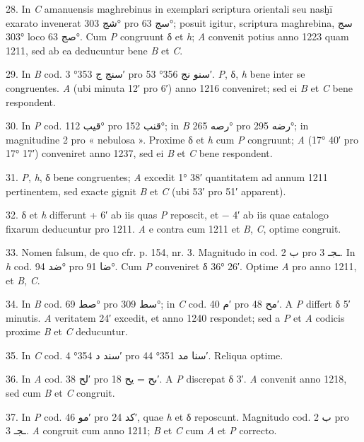 \documentclass[11pt]{article}
\begin{document}
{\small
\par\hangindent=12mm 28. In \textit{C} amanuensis maghrebinus in exemplari scriptura orientali seu nasḫī exarato invenerat \textarabic{شج} 303° pro \textarabic{سج} 63°; posuit igitur, scriptura maghrebina, \textarabic{سج} 303° loco \textarabic{صج} 63°. Cum \textit{P} congruunt δ et \textit{h}; \textit{A} convenit potius anno 1223 quam 1211, sed ab ea deducuntur bene \textit{B} et \textit{C}.
\par\hangindent=12mm 29. In \textit{B} cod. \textarabic{سنج ج} 353° 3′ pro \textarabic{سنو نج} 356° 53′. \textit{P}, δ, \textit{h} bene inter se congruentes. \textit{A} (ubi minuta 12′ pro 6′) anno 1216 conveniret; sed ei \textit{B} et \textit{C} bene respondent.
\par\hangindent=12mm 30. In \textit{P} cod. \textarabic{قيب} 112° pro \textarabic{قنب} 152°; in \textit{B} \textarabic{رصه} 265° pro \textarabic{رضه} 295°; in magnitudine 2 pro « nebulosa ». Proxime δ et \textit{h} cum \textit{P} congruunt; \textit{A} (17° 40′ pro 17° 17′) conveniret anno 1237, sed ei \textit{B} et \textit{C} bene respondent.
\par\hangindent=12mm 31. \textit{P}, \textit{h}, δ bene congruentes; \textit{A} excedit 1° 38′ quantitatem ad annum 1211 pertinentem, sed exacte gignit \textit{B} et \textit{C} (ubi 53′ pro 51′ apparent).
\par\hangindent=12mm 32. δ et \textit{h} differunt + 6′ ab iis quas \textit{P} reposcit, et − 4′ ab iis quae catalogo fixarum deducuntur pro 1211. \textit{A} e contra cum 1211 et \textit{B}, \textit{C}, optime congruit.
\par\hangindent=12mm 33. Nomen falsum, de quo cfr. p. 154, nr. 3. Magnitudo in cod. \textarabic{ب} 2 pro \textarabic{ـجـ} 3. In \textit{h} cod. \textarabic{ضد} 94° pro \textarabic{ضا} 91°. Cum \textit{P} conveniret δ 36° 26′. Optime \textit{A} pro anno 1211, et \textit{B}, \textit{C}.
\par\hangindent=12mm 34. In \textit{B} cod. \textarabic{صط} 69° pro \textarabic{سط} 309°; in \textit{C} cod. \textarabic{م} 40′ pro \textarabic{مح} 48′. A \textit{P} differt δ 5′ minutis. \textit{A} veritatem 24′ excedit, et anno 1240 respondet; sed a \textit{P} et \textit{A} codicis proxime \textit{B} et \textit{C} deducuntur.
\par\hangindent=12mm 35. In \textit{C} cod. \textarabic{سند د} 354° 4′ pro \textarabic{سنا مد} 351° 44′. Reliqua optime.
\par\hangindent=12mm 36. In \textit{A} cod. \textarabic{لح} 38′ pro \textarabic{ىح} = \textarabic{يح} 18′. A \textit{P} discrepat δ 3′. \textit{A} convenit anno 1218, sed cum \textit{B} et \textit{C} congruit.
\par\hangindent=12mm 37. In \textit{P} cod. \textarabic{مو} 46′ pro \textarabic{كد} 24′, quae \textit{h} et δ reposcunt. Magnitudo cod. \textarabic{ب} 2 pro \textarabic{ـجـ} 3. \textit{A} congruit cum anno 1211; \textit{B} et \textit{C} cum \textit{A} et \textit{P} correcto.
\par}
\end{document}
